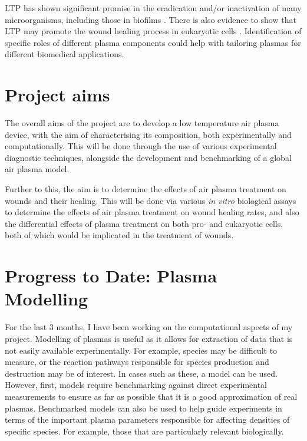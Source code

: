 \documentclass[11pt, oneside]{article}   	%
\begin{document}
LTP has shown significant promise in the eradication and/or inactivation of many microorganisms, including those in biofilms \cite{Laroussi2005low}. 
There is also evidence to show that LTP may promote the wound healing process in eukaryotic cells \cite{Haertel2014nonthermal, Kramer2013suitability}.
Identification of specific roles of different plasma components could help with tailoring plasmas for different biomedical applications.

\section{Project aims}

The overall aims of the project are to develop a low temperature air plasma device, with the aim of characterising its composition, both experimentally and computationally.
This will be done through the use of various experimental diagnostic techniques, alongside the development and benchmarking of a global air plasma model.

Further to this, the aim is to determine the effects of air plasma treatment on wounds and their healing.
This will be done via various \textit{in vitro} biological assays to determine the effects of air plasma treatment on wound healing rates, and also the differential effects of plasma treatment on both pro- and eukaryotic cells, both of which would be implicated in the treatment of wounds.


\section{Progress to Date: Plasma Modelling}
For the last 3 months, I have been working on the computational aspects of my project.
Modelling of plasmas is useful as it allows for extraction of data that is not easily available experimentally. 
For example, species may be difficult to measure, or the reaction pathways responsible for species production and destruction may be of interest.
In cases such as these, a model can be used.
However, first, models require benchmarking against direct experimental measurements to ensure as far as possible that it is a good approximation of real plasmas.
Benchmarked models can also be used to help guide experiments in terms of the important plasma parameters responsible for affecting densities of specific species. 
For example, those that are particularly relevant biologically.
\end{document}
